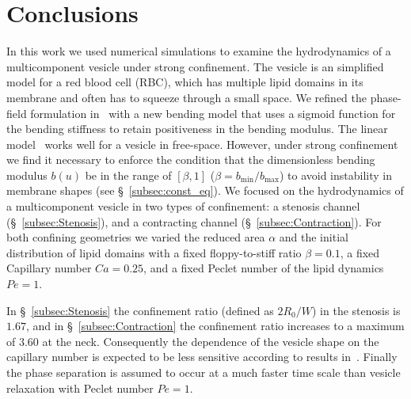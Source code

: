 \documentclass[twoside,twocolumn,9pt]{article}
\begin{document}



\section{Conclusions \label{sec:conclusion}}
In this work we used numerical simulations to examine the hydrodynamics
of a multicomponent vesicle under strong confinement. The vesicle is an
simplified model for a red blood cell (RBC), which has multiple lipid
domains in its membrane and often has to squeeze through a small space.
We refined the phase-field formulation in~\citet{liu-mar-li-vee-low2017}
with a new bending model that uses a sigmoid function for the bending
stiffness to retain positiveness in the bending modulus. The linear
model~\cite{liu-mar-li-vee-low2017} works well for a vesicle in
free-space. However, under strong confinement we find it necessary to
enforce the condition that the dimensionless bending modulus $b(u)$ be
in the range of $[\beta,1]$ ($\beta = b_{\min}/b_{\max}$) to avoid
instability in membrane shapes (see \S~\ref{subsec:const_eq}). We
focused on the hydrodynamics of a multicomponent vesicle in two types of
confinement: a stenosis channel (\S~\ref{subsec:Stenosis}), and a
contracting channel (\S~\ref{subsec:Contraction}). For both confining
geometries we varied the reduced area $\alpha$ and the initial
distribution of lipid domains with a fixed floppy-to-stiff ratio
$\beta=0.1$, a fixed Capillary number $Ca=0.25$, and a fixed Peclet
number of the lipid dynamics $Pe=1$. 

In \S~\ref{subsec:Stenosis} the confinement ratio (defined as $2R_0/W$)
in the stenosis is $1.67$, and in \S~\ref{subsec:Contraction} the
confinement ratio increases to a maximum of $3.60$ at the neck.
Consequently the dependence of the vesicle shape on the capillary number
is expected to be less sensitive according to results
in~\citet{aga-bir2020}. Finally the phase separation is assumed to occur
at a much faster time scale than vesicle relaxation with Peclet number
$Pe=1$.
\end{document}
